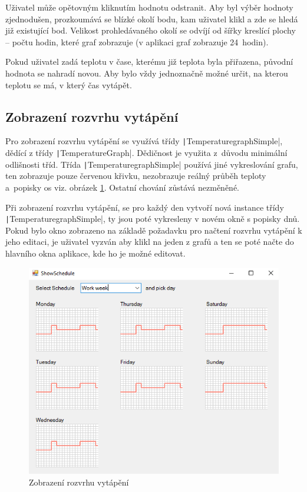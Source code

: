 \documentclass[thesis=B,czech]{FITthesis}[2012/10/20]
\begin{document}
Uživatel může opětovným kliknutím hodnotu odstranit. Aby byl výběr hodnoty zjednodušen, prozkoumává se blízké okolí bodu, kam uživatel klikl a zde se hledá již existující bod. Velikost prohledávaného okolí se odvíjí od šířky kreslící plochy -- počtu hodin, které graf zobrazuje (v aplikaci graf zobrazuje 24~hodin).

Pokud uživatel zadá teplotu v čase, kterému již teplota byla přiřazena, původní hodnota se nahradí novou. Aby bylo vždy jednoznačně možné určit, na kterou teplotu se má, v který čas vytápět.

\subsection{Zobrazení rozvrhu vytápění}

Pro zobrazení rozvrhu vytápění se využívá třídy  \texttt|TemperaturegraphSimple|, dědící z třídy  \texttt|TemperatureGraph|. Dědičnost je využita z~důvodu minimální odlišnosti tříd. Třída  \texttt|TemperaturegraphSimple| používá jiné vykreslování gra\-fu, ten zobrazuje pouze červenou křivku, nezobrazuje reálný průběh teploty a~popisky os viz. obrázek \ref{fig:grafVyber}. Ostatní chování zůstává nezměněné.

Při zobrazení rozvrhu vytápění, se pro každý den vytvoří nová instance třídy  \texttt|TemperaturegraphSimple|, ty jsou poté vykresleny v novém okně s popisky dnů. Pokud bylo okno zobrazeno na základě požadavku pro načtení rozvrhu vytápění k jeho editaci, je uživatel vyzván aby klikl na jeden z grafů a ten se poté načte do hlavního okna aplikace, kde ho je možné editovat.
\newline

\begin{figure}\centering
	\includegraphics[width=\textwidth]{diagrams/GrafVyber}
	\caption{Zobrazení rozvrhu vytápění}\label{fig:grafVyber}
\end{figure}
\end{document}
